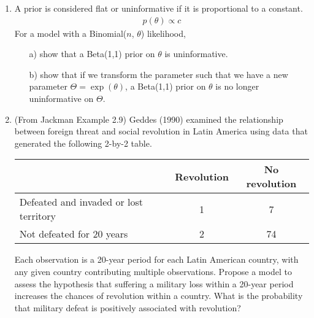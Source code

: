 \documentclass[10pt,a4paper]{article}
\begin{document}
\begin{enumerate}
\bigskip

\item A prior is considered flat or uninformative if it is proportional to a constant.
\begin{eqnarray*}
p(\theta) \propto c
\end{eqnarray*}
For a model with a Binomial($n$, $\theta$) likelihood,
\begin{itemize}
\item[a)] show that a Beta(1,1) prior on $\theta$ is uninformative. \\
\item[b)] show that if we transform the parameter such that we have a new parameter $\Theta = \exp(\theta)$, a Beta(1,1) prior on $\theta$ is no longer uninformative on $\Theta$. 
\end{itemize}

\bigskip

\item (From Jackman Example 2.9) Geddes (1990) examined the relationship between foreign threat and social revolution in Latin America using data that generated the following 2-by-2 table.

\medskip
\begin{center}
\begin{tabular}{lcc}
\hline 
& Revolution & No revolution \\
\hline
Defeated and invaded or lost territory & 1 & 7 \\
Not defeated for 20 years & 2 & 74 \\
\hline
\end{tabular}
\end{center}
\medskip

Each observation is a 20-year period for each Latin American country, with any given country contributing multiple observations.  Propose a model to assess the hypothesis that suffering a military loss within a 20-year period increases the chances of revolution within a country.  What is the probability that military defeat is positively associated with revolution?

\end{enumerate}
\end{document}
